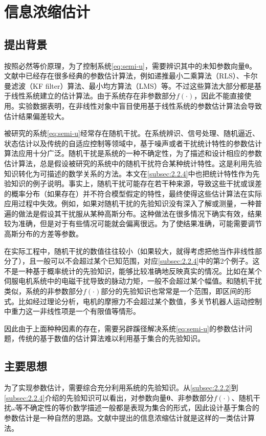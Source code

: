\section{信息浓缩估计}
\label{sect:2.3}
\subsection{提出背景}
\label{subsec:2.3.1}
按照必然等价原理，为了控制系统\eqref{eq:semi-u}，需要辨识其中的未知参数向量$\bm{\theta}$。文献中已经存在很多经典的参数估计算法，例如递推最小二乘算法（RLS）、卡尔曼滤波（KF filter）算法、最小均方算法（LMS）等。不过这些算法大部分都是基于线性系统建立的估计算法。由于系统存在非参数部分$f(\cdot)$，因此不能直接使用。实验数据表明，在非线性对象中盲目使用基于线性系统的参数估计算法会导致估计结果偏差较大。

被研究的系统\eqref{eq:semi-u}经常存在随机干扰。在系统辨识、信号处理、随机逼近、状态估计以及传统的自适应控制等领域中，基于噪声或者干扰统计特性的参数估计算法应用十分广泛。随机干扰是系统的一种不确定性，为了描述和设计相应的参数估计算法，总是假设被研究的系统中的随机干扰符合某种统计特性。这是利用先验知识转化为可描述的数学关系的方法。本文在\ref{subsec:2.2.4}中也把统计特性作为先验知识的例子说明。事实上，随机干扰可能存在若干种来源，导致这些干扰或误差的概率分布（如果存在）并不符合模型假定的特性，最终使得这些估计算法在实际应用过程中失效。例如，如果对随机干扰的先验知识没有深入了解或测量，一种普遍的做法是假设其干扰服从某种高斯分布。这种做法在很多情况下确实有效，结果较为准确，但是对于有些情况可能就会偏离很远。为了使结果准确，可能需要调节高斯分布的方差等参数。

在实际工程中，随机干扰的数值往往较小（如果较大，就得考虑把他当作非线性部分了），且一般可以不会超过某个已知范围，对应\ref{subsec:2.2.4}中的第2个例子。这不是一种基于概率统计的先验知识，能够比较准确地反映真实的情况。比如在某个伺服电机系统中的电磁干扰导致的脉动力矩，一般不会超过某个幅值。和随机干扰类似，系统的非参数部分$f(\cdot)$部分的先验知识也常常是一个范围，即区间的形式。比如经过理论分析，电机的摩擦力不会超过某个数值，多关节机器人运动控制中重力这一非线性项是一个有限值等情形。

因此由于上面种种因素的存在，需要另辟蹊径解决系统\eqref{eq:semi-u}的参数估计问题，传统的基于数值的估计算法难以利用基于集合的先验知识。
\subsection{主要思想}
\label{subsec:2.3.2}
为了实现参数估计，需要综合充分利用系统的先验知识。从\ref{subsec:2.2.2}到\ref{subsec:2.2.4}介绍的先验知识可以看出，对参数向量$\bm{\theta}$、非参数部分$f(\cdot)$、随机干扰$\omega$等不确定性的等价数学描述一般都是表现为集合的形式，因此设计基于集合的参数估计是一种自然的思路。文献\cite{MaLum2009}中提出的信息浓缩估计就是这样的一类估计算法。

